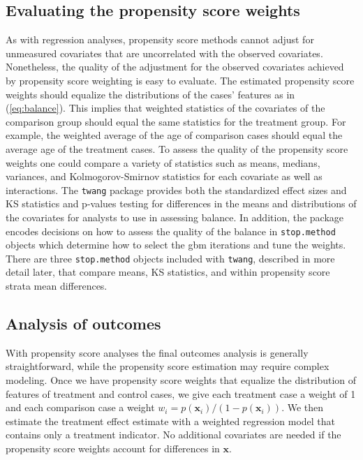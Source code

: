 \documentclass{article}
\begin{document}
\subsection{Evaluating the propensity score weights}

As with regression analyses, propensity score methods cannot adjust for
unmeasured covariates that are uncorrelated with the observed covariates.
Nonetheless, the quality of the adjustment for the observed covariates achieved
by propensity score weighting is easy to evaluate. The estimated propensity
score weights should equalize the distributions of the cases' features as in
(\ref{eq:balance}). This implies that weighted statistics of the covariates of
the comparison group should equal the same statistics for the treatment group.
For example, the weighted average of the age of comparison cases should equal
the average age of the treatment cases. To assess the quality of the propensity
score weights one could compare a variety of statistics such as means, medians,
variances, and Kolmogorov-Smirnov statistics for each covariate as well as
interactions. The \texttt{twang} package provides both the standardized effect sizes and KS 
statistics and p-values testing for differences in the means and distributions of the covariates for analysts to 
use in assessing balance. In addition, the package encodes decisions on how to assess the
quality of the balance in \texttt{stop.method} objects which determine how to select the gbm iterations
and tune the weights. There are three
\texttt{stop.method} objects included with \texttt{twang}, described in more
detail later, that compare means, KS statistics, and within propensity score
strata mean differences.

\subsection{Analysis of outcomes}

With propensity score analyses the final outcomes analysis is generally
straightforward, while the propensity score estimation may require complex
modeling. Once we have propensity score weights that equalize the distribution
of features of treatment and control cases, we give each treatment case a
weight of 1 and each comparison case a weight $w_i = p(\mathbf{x}_i)/(1 -
p(\mathbf{x}_i))$. We then estimate the treatment effect estimate with a
weighted regression model that contains only a treatment indicator. No
additional covariates are needed if the propensity score weights account for
differences in $\mathbf{x}$.
\end{document}
